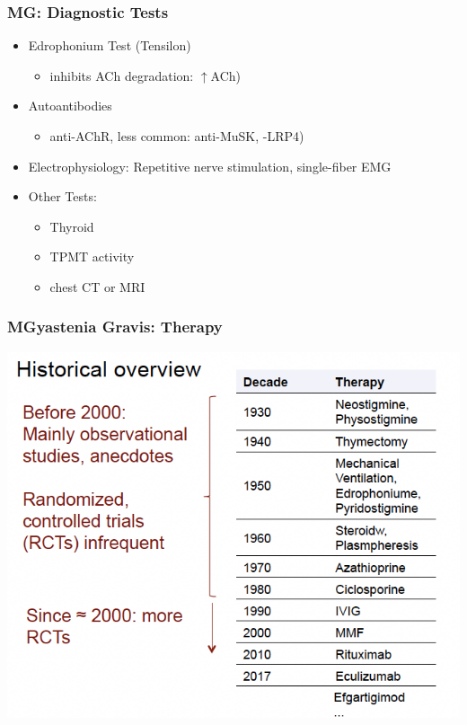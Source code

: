 \begin{itemize}
\begin{itemize}
\subsubsection{MG: Diagnostic Tests}
\begin{itemize}
    \item Edrophonium Test (Tensilon)
\begin{itemize}
    \item inhibits ACh degradation: $\uparrow$ACh)
\end{itemize} 
\item Autoantibodies
\begin{itemize}
    \item anti-AChR, less common: anti-MuSK, -LRP4)
\end{itemize}
\item Electrophysiology:
Repetitive nerve stimulation, single-fiber EMG
\item Other Tests:
\begin{itemize}
    \item Thyroid
\item TPMT activity
\item chest CT or MRI
\end{itemize}

\end{itemize}

\subsubsection{MGyastenia Gravis: Therapy}
\includegraphics[width=1\textwidth]{Images/MGThera.png}\\[1cm]


\end{itemize}
\end{itemize}

